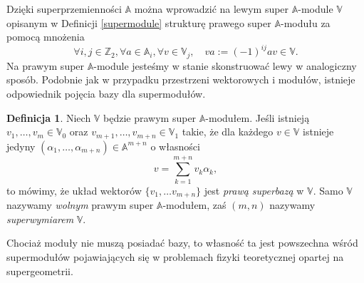 \documentclass[11pt,a4paper]{report}
\theoremstyle{definition}
\newtheorem{definition}[theorem]{Definicja}
\begin{document}
Dzięki superprzemienności $\mathbb{A}$ można wprowadzić na lewym super $\mathbb{A}$-module $\mathbb{V}$ opisanym w Definicji \ref{supermodule} strukturę prawego super $\mathbb{A}$-modułu za pomocą mnożenia 
\begin{equation}
\label{disupermodule}
\forall i,j \in \mathbb{Z}_2, \forall a \in \mathbb{A}_i, \forall v \in \mathbb{V}_j, \quad va := (-1)^{ij}av \in \mathbb{V}.
\end{equation}
Na prawym super $\mathbb{A}$-module jesteśmy w stanie skonstruować lewy w analogiczny sposób. Podobnie jak w przypadku przestrzeni wektorowych i modułów, istnieje odpowiednik pojęcia bazy dla supermodułów.

\begin{definition}
\label{superbasis}
Niech $\mathbb{V}$ będzie prawym super $\mathbb{A}$-modułem. Jeśli istnieją $v_1, \ldots, v_m \in \mathbb{V}_0$ oraz $v_{m+1}, \ldots ,v_{m+n} \in \mathbb{V}_1$ takie, że dla każdego $v\in \mathbb{V}$ istnieje jedyny $(\alpha_1, \ldots, \alpha_{m+n}) \in \mathbb{A}^{m+n}$ o własności
\begin{equation*}
v = \sum_{k=1}^{m+n} v_k \alpha_k,
\end{equation*}
to mówimy, że układ wektorów $\{ v_1, \ldots v_{m+n} \}$ jest \textit{prawą superbazą} w $\mathbb{V}$. Samo $\mathbb{V}$ nazywamy \textit{wolnym} prawym super $\mathbb{A}$-modułem, zaś $(m,n)$ nazywamy \textit{superwymiarem} $\mathbb{V}$.
\end{definition}

Chociaż moduły nie muszą posiadać bazy, to własność ta jest powszechna wśród supermodułów pojawiających się w problemach fizyki teoretycznej opartej na supergeometrii. 
\end{document}

